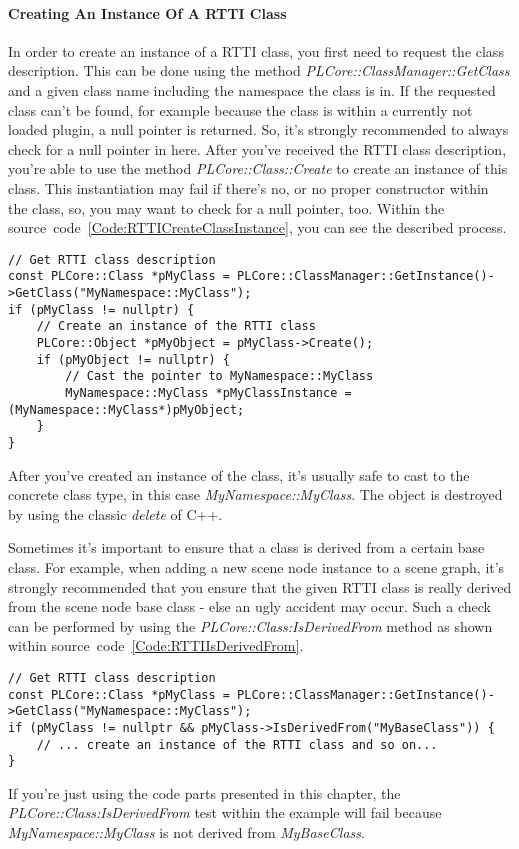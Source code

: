 \paragraph{Creating An Instance Of A RTTI Class}
In order to create an instance of a RTTI class, you first need to request the class description. This can be done using the method \emph{PLCore::ClassManager::GetClass} and a given class name including the namespace the class is in. If the requested class can't be found, for example because the class is within a currently not loaded plugin, a null pointer is returned. So, it's strongly recommended to always check for a null pointer in here. After you've received the RTTI class description, you're able to use the method \emph{PLCore::Class::Create} to create an instance of this class. This instantiation may fail if there's no, or no proper constructor within the class, so, you may want to check for a null pointer, too. Within the source~code~\ref{Code:RTTICreateClassInstance}, you can see the described process.
\begin{lstlisting}[float=htb,label=Code:RTTICreateClassInstance,caption={Creating an instance of a RTTI class}]
// Get RTTI class description
const PLCore::Class *pMyClass = PLCore::ClassManager::GetInstance()->GetClass("MyNamespace::MyClass");
if (pMyClass != nullptr) {
	// Create an instance of the RTTI class
	PLCore::Object *pMyObject = pMyClass->Create();
	if (pMyObject != nullptr) {
		// Cast the pointer to MyNamespace::MyClass
		MyNamespace::MyClass *pMyClassInstance = (MyNamespace::MyClass*)pMyObject;
	}
}
\end{lstlisting}
After you've created an instance of the class, it's usually safe to cast to the concrete class type, in this case \emph{MyNamespace::MyClass}. The object is destroyed by using the classic \emph{delete} of C++.

Sometimes it's important to ensure that a class is derived from a certain base class. For example, when adding a new scene node instance to a scene graph, it's strongly recommended that you ensure that the given RTTI class is really derived from the scene node base class - else an ugly accident may occur. Such a check can be performed by using the \emph{PLCore::Class:IsDerivedFrom} method as shown within source~code~\ref{Code:RTTIIsDerivedFrom}.
\begin{lstlisting}[float=htb,label=Code:RTTIIsDerivedFrom,caption={Ensure that a class is derived from a certain base class}]
// Get RTTI class description
const PLCore::Class *pMyClass = PLCore::ClassManager::GetInstance()->GetClass("MyNamespace::MyClass");
if (pMyClass != nullptr && pMyClass->IsDerivedFrom("MyBaseClass")) {
	// ... create an instance of the RTTI class and so on...
}
\end{lstlisting}
If you're just using the code parts presented in this chapter, the \emph{PLCore::Class:IsDerivedFrom} test within the example will fail because \emph{MyNamespace::MyClass} is not derived from \emph{MyBaseClass}.


